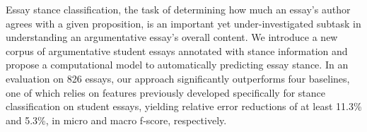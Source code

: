 Essay stance classification, the task of determining how much an essay's author agrees with a given proposition, is an important yet under-investigated subtask in understanding an argumentative essay's overall content. We introduce a new corpus of argumentative student essays annotated with stance information and propose a computational model to automatically predicting essay stance. In an evaluation on 826 essays, our approach significantly outperforms four baselines, one of which relies on features previously developed specifically for stance classification on student essays, yielding relative error reductions of at least 11.3\% and 5.3\%, in micro and macro f-score, respectively.
